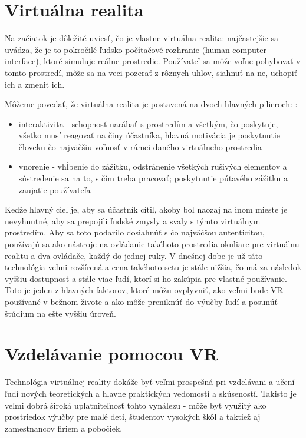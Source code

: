 \documentclass[10pt,twoside,slovak,a4paper]{article}
\begin{document}
\section{Virtuálna realita} \label{druha}

Na začiatok je dôležité uviesť, čo je vlastne virtuálna realita: najčastejšie sa uvádza,\cite{VR} že je to pokročilé ľudsko-počítačové rozhranie (human-computer interface), ktoré simuluje reálne prostredie. Používateľ sa môže voľne pohybovať v tomto prostredí, môže sa na veci pozerať z rôznych uhlov, siahnuť na ne, uchopiť ich a zmeniť ich. 

Môžeme povedať, že virtuálna realita je postavená na dvoch hlavných pilieroch: \cite{VR_kniha}:
\begin{itemize}
\item interaktivita - schopnosť narábať s prostredím a všetkým, čo poskytuje, všetko musí reagovať na činy účastníka, hlavná motivácia je poskytnutie človeku čo najväčšiu voľnosť v rámci daného virtuálneho prostredia
\item vnorenie - vhĺbenie do zážitku, odstránenie všetkých rušivých elementov a sústredenie sa na to, s čím treba pracovať; poskytnutie pútavého zážitku a zaujatie používateľa
\end{itemize}

Kedže hlavný cieľ je, aby sa účastník cítil, akoby bol naozaj na inom mieste je nevyhnutné, aby sa prepojili ľudské zmysly a svaly s týmto virtuálnym prostredím. Aby sa toto podarilo dosiahnúť s čo najväčšou autenticitou, používajú sa ako nástroje na ovládanie takéhoto prostredia okuliare pre virtuálnu realitu a dva ovládače, každý do jednej ruky. 
V dnešnej dobe je už táto technológia veľmi rozšírená a cena takéhoto setu je stále nižšia, čo má za následok vyššiu dostupnosť a stále viac ľudí, ktorí si ho zakúpia pre vlastné používanie. Toto je jeden z hlavných faktorov, ktoré môžu ovplyvniť, ako veľmi bude VR používané v bežnom živote a ako môže preniknúť do výučby ľudí a posunúť štúdium na ešte vyššiu úroveň.

\section{Vzdelávanie pomocou VR} \label{tretia}
Technológia virtuálnej reality dokáže byť veľmi prospešná pri vzdelávani a učení ľudí nových teoretických a hlavne praktických vedomostí a skúseností. Takisto je veľmi dobrá široká uplatniteľnosť tohto vynálezu - môže byť využitý ako prostriedok výučby pre malé deti, študentov vysokých škôl a taktiež aj zamestnancov firiem a pobočiek. 
\end{document}
